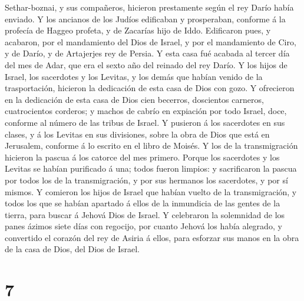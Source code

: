 Sethar-boznai, y sus compañeros, hicieron prestamente según el rey Darío
había enviado.  Y los ancianos de los Judíos edificaban y
prosperaban, conforme á la profecía de Haggeo profeta, y de Zacarías
hijo de Iddo. Edificaron pues, y acabaron, por el mandamiento del Dios
de Israel, y por el mandamiento de Ciro, y de Darío, y de Artajerjes rey
de Persia.  Y esta casa fué acabada al tercer día del mes
de Adar, que era el sexto año del reinado del rey Darío.  Y
los hijos de Israel, los sacerdotes y los Levitas, y los demás que
habían venido de la trasportación, hicieron la dedicación de esta casa
de Dios con gozo.  Y ofrecieron en la dedicación de esta
casa de Dios cien becerros, doscientos carneros, cuatrocientos corderos;
y machos de cabrío en expiación por todo Israel, doce, conforme al
número de las tribus de Israel.  Y pusieron á los
sacerdotes en sus clases, y á los Levitas en sus divisiones, sobre la
obra de Dios que está en Jerusalem, conforme á lo escrito en el libro de
Moisés.  Y los de la transmigración hicieron la pascua á
los catorce del mes primero.  Porque los sacerdotes y los
Levitas se habían purificado á una; todos fueron limpios: y sacrificaron
la pascua por todos los de la transmigración, y por sus hermanos los
sacerdotes, y por sí mismos.  Y comieron los hijos de
Israel que habían vuelto de la transmigración, y todos los que se habían
apartado á ellos de la inmundicia de las gentes de la tierra, para
buscar á Jehová Dios de Israel.  Y celebraron la solemnidad
de los panes ázimos siete días con regocijo, por cuanto Jehová los había
alegrado, y convertido el corazón del rey de Asiria á ellos, para
esforzar sus manos en la obra de la casa de Dios, del Dios de Israel.

\hypertarget{section-6}{%
\section{7}\label{section-6}}

